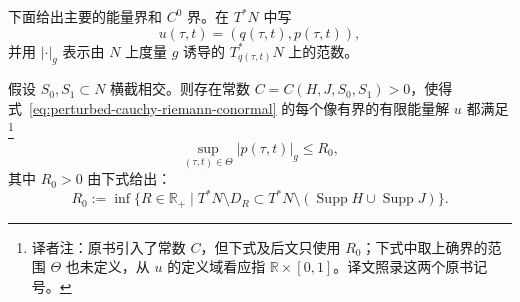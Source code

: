 下面给出主要的能量界和 $C^0$ 界。在 $T^*N$ 中写
\[
  u(\tau,t)=(q(\tau,t),p(\tau,t)),
\]
并用 $|\mathord\cdot|_g$ 表示由 $N$ 上度量 $g$ 诱导的 $T_{q(\tau,t)}^*N$ 上的范数。

\begin{theorem}
\label{thm:cotangent-floer-c0-bound}
假设 $S_0,S_1\subset N$ 横截相交。则存在常数 $C=C(H,J,S_0,S_1)>0$，使得式~\eqref{eq:perturbed-cauchy-riemann-conormal} 的每个像有界的有限能量解 $u$ 都满足\footnote{译者注：原书引入了常数 $C$，但下式及后文只使用 $R_0$；下式中取上确界的范围 $\Theta$ 也未定义，从 $u$ 的定义域看应指 $\mathbb R\times[0,1]$。译文照录这两个原书记号。}
\begin{equation}
  \sup_{(\tau,t)\in\Theta}|p(\tau,t)|_g\le R_0,
  \label{eq:cotangent-fiber-c0-bound}
\end{equation}
其中 $R_0>0$ 由下式给出：
\[
  R_0
  :=\inf\{R\in\mathbb R_+
    \mid T^*N\setminus D_R
    \subset T^*N\setminus(\operatorname{Supp}H\cup\operatorname{Supp}J)\}.
\]
\end{theorem}

